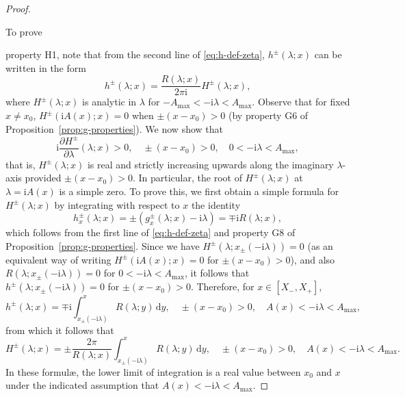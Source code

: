 \documentclass[12pt]{amsart}
\numberwithin{equation}{section}
\newcommand{\dd}{\mathrm{d}}
\newcommand{\ii}{\mathrm{i}}
\newcommand{\SP}{\lambda}
\begin{document}
\begin{proof}
\hypertarget{proof-h-prop}{To prove} property H1, 
note that from the second line of \eqref{eq:h-def-zeta}, $h^\pm(\SP;x)$ can be written in the form 
\begin{equation}
h^\pm(\SP;x)=\frac{R(\SP;x)}{2\pi \ii}H^\pm(\SP;x),
\label{eq:hH}
\end{equation}
where 
$H^\pm(\SP;x)$ is analytic in $\SP$ for $-A_\mathrm{max}<-\ii\SP<A_\mathrm{max}$.  Observe that for fixed $x\neq x_0$, $H^\pm(\ii A(x);x)=0$ when $\pm(x-x_0)>0$ (by property G6 of Proposition~\ref{prop:g-properties}).  We now show that 
\begin{equation}
\ii\frac{\partial H^\pm}{\partial \SP}(\SP;x)>0,\quad \pm(x-x_0)>0,\quad 0<-\ii\SP<A_\mathrm{max},
\label{eq:Hpm-derivative-inequality}
\end{equation}
that is, $H^\pm(\SP;x)$ is real and strictly increasing upwards along the imaginary $\SP$-axis provided $\pm(x-x_0)>0$.  In particular, the root of $H^\pm(\SP;x)$ at $\SP=\ii A(x)$ is a simple zero.  To prove this, we first obtain a simple formula for $H^\pm(\SP;x)$ by integrating with respect to $x$ the identity
\begin{equation}
h^\pm_x(\SP;x)=\pm\left(g^\pm_x(\SP;x)-\ii\SP\right)=\mp\ii R(\SP;x),
\label{eq:h-x-derivative}
\end{equation}
which follows from the first line of \eqref{eq:h-def-zeta} and property G8 of Proposition~\ref{prop:g-properties}.
Since we have $H^\pm(\SP;x_\pm(-\ii\SP))=0$ (as an equivalent way of writing $H^\pm(\ii A(x);x)=0$ for $\pm (x-x_0)>0$), and also $R(\SP;x_\pm(-\ii \SP))=0$ for $0<-\ii\SP<A_\mathrm{max}$, it follows that $h^\pm(\SP;x_\pm(-\ii\SP))=0$ for $\pm(x-x_0)>0$.  Therefore, for $x\in [X_-,X_+]$,
\begin{equation}
h^\pm(\SP;x)=\mp \ii\int_{x_\pm(-\ii\SP)}^x R(\SP;y)\,\dd y,\quad \pm (x-x_0)>0,\quad A(x)<-\ii\SP<A_\mathrm{max},
\label{eq:h-integral}
\end{equation}
from which it follows that
\begin{equation}
H^\pm(\SP;x)=\pm\frac{2\pi}{R(\SP;x)}\int_{x_\pm(-\ii\SP)}^x R(\SP;y)\,\dd y,\quad\pm (x-x_0)>0,\quad A(x)<-\ii\SP<A_\mathrm{max}.
\label{eq:H-integral}
\end{equation}
In these formul\ae, the lower limit of integration is a real value between $x_0$ and $x$ under the indicated assumption that $A(x)<-\ii\SP<A_\mathrm{max}$.

\end{proof}
\end{document}
